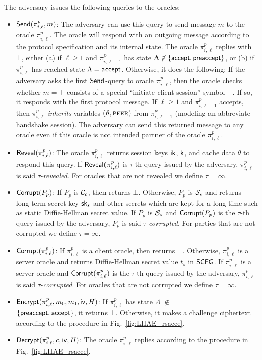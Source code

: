 The adversary issues the following queries to the
oracles:
\begin{itemize}
 \item {$\mathsf{Send}(\pi^p_{i, \ell}, m)$:
 The adversary can use this query to send message
 $m$ to the oracle $\pi^p_{i, \ell}$.
 The oracle will respond with an outgoing message
 according to the protocol specification and its
 internal state.
 The oracle $\pi^p_{i, \ell}$ replies with $\bot$,
 either (a) if $\ell \geq 1$ and
 $\pi^p_{i, {\ell-1}}$ has state
 $\Lambda\not\in \{\mathsf{accept}, \mathsf{preaccept}\}$, or (b)
 if $\pi^p_{i,\ell}$ has reached state
 $\Lambda = \mathsf{accept}$.
 Otherwise, it does the following: If the adversary
 asks the first $\mathsf{Send}$-query to oracle
 $\pi^p_{i, \ell}$, then the oracle checks whether
 $m = \top$ consists of a special
 ``initiate client session'' symbol $\top$.
 If so, it responds with the first protocol message.
 If $\ell \geq 1$ and $\pi^p_{i,\ell-1}$ accepts,
 then $\pi^p_{i,\ell}$ \textit{inherits} variables $(\theta,\textsc{peer})$ from
 $\pi^p_{i, \ell-1}$ (modeling an abbreviate handshake
 session).
 The adversary can send this returned message to any
 oracle even if this oracle is not intended partner of
 the oracle $\pi^p_{i, \ell}$.}

 \item {$\mathsf{Reveal}(\pi^p_{i,\ell})$:
 The oracle $\pi^p_{i,\ell}$ returns session keys
 $\mathsf{ik}$, $\mathsf{k}$, and cache data $\theta$ to respond this query.
 If $\mathsf{Reveal}(\pi^p_{i,\ell})$ is $\tau$-th query issued by the adversary,
 $\pi^p_{i,\ell}$ is said $\tau$-\textit{revealed}.
 For oracles that are not revealed we define
 $\tau = \infty$.}

 \item {$\mathsf{Corrupt}(P_p)$:
 If $P_p$ is $\mathcal{C}_c$, then returns $\bot$.
 Otherwise, $P_p$ is $\mathcal{S}_s$ and returns long-term
 secret key $\mathsf{sk}_s$ and other secrets which are kept
 for a long time such as static Diffie-Hellman secret
 value.
 If $P_p$ is $\mathcal{S}_s$ and $\mathsf{Corrupt}(P_p)$ is the
 $\tau$-th query issued by the adversary, $P_p$ is said
 $\tau$-\textit{corrupted}.
 For parties that are not corrupted we define
 $\tau = \infty$.}

\item {$\mathsf{Corrupt}(\pi^p_{i,\ell})$:
 If $\pi^p_{i,\ell}$ is a client oracle, then returns $\bot$.
 Otherwise, $\pi^p_{i,\ell}$ is a server oracle and returns
 Diffie-Hellman secret value $t_s$ in $\mathsf{SCFG}$.
 If $\pi^p_{i,\ell}$ is a server oracle and $\mathsf{Corrupt}(\pi^p_{i,\ell})$ is the
 $\tau$-th query issued by the adversary, $\pi^p_{i,\ell}$ is said
 $\tau$-\textit{corrupted}.
 For oracles that are not corrupted we define
 $\tau = \infty$.}

 \item {$\mathsf{Encrypt}(\pi^p_{i,\ell}, m_0, m_1, \mathsf{iv}, H)$:
 If $\pi^p_{i,\ell}$ has state
 $\Lambda$ $\not\in$ \\ $\{\mathsf{preaccept}, \mathsf{accept}\}$,
 it returns $\bot$.
 Otherwise, it makes a challenge ciphertext according to
 the procedure in Fig.~\ref{fig:LHAE_rsacce}.}

 \item {$\mathsf{Decrypt}(\pi^p_{i, \ell}, c, \mathsf{iv}, H)$:
 The oracle $\pi^p_{i, \ell}$ replies according to the
 procedure in Fig.~\ref{fig:LHAE_rsacce}.}
\end{itemize}

